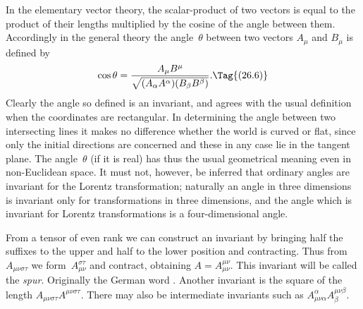 \documentclass[12pt]{book}
\begin{document}
In the elementary vector theory, the scalar\hyp{}product of two vectors is
equal to the product of their lengths multiplied by the cosine of the angle
%
between them. Accordingly in the general theory the angle~$\theta$ between two
vectors $A_{\mu}$ and $B_{\mu}$ is defined by
\[
\cos\theta = \frac{A_{\mu} B^{\mu}}{\sqrt{(A_{\alpha} A^{\alpha}) (B_{\beta} B^{\beta})}}.
\Tag{(26.6)}
\]
Clearly the angle so defined is an invariant, and agrees with the usual
%
definition when the coordinates are rectangular. In determining the angle
between two intersecting lines it makes no difference whether the world is
curved or flat, since only the initial directions are concerned and these in any
case lie in the tangent plane. The angle~$\theta$ (if it is real) has thus the usual
geometrical meaning even in non\hyp{}Euclidean space. It must not, however, be
inferred that ordinary angles are invariant for the Lorentz transformation;
naturally an angle in three dimensions is invariant only for transformations
in three dimensions, and the angle which is invariant for Lorentz transformations
is a four\hyp{}dimensional angle.

From a tensor of even rank we can construct an invariant by bringing
half the suffixes to the upper and half to the lower position and contracting.
Thus from~$A_{\mu\nu\sigma\tau}$ we form~$A_{\mu\nu}^{\sigma\tau}$ and contract, obtaining $A = A_{\mu\nu}^{\mu\nu}$. This invariant
will be called the \emph{spur}\footnotemark.\footnotetext
  {Originally the German word .}
Another invariant is the square of the
%
length $A_{\mu\nu\sigma\tau} A^{\mu\nu\sigma\tau}$. There may also be intermediate invariants such as
$A_{\mu\nu\alpha}^{\alpha} A_{\beta}^{\mu\nu\beta}$.

%
%
\end{document}
